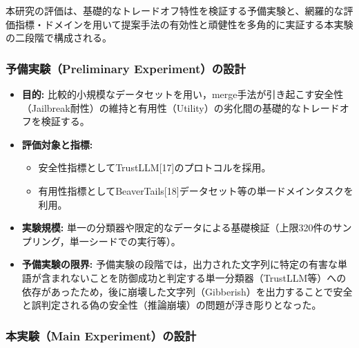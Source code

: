 \documentclass{article}
\begin{document}
本研究の評価は、基礎的なトレードオフ特性を検証する予備実験と、網羅的な評価指標・ドメインを用いて提案手法の有効性と頑健性を多角的に実証する本実験の二段階で構成される。

\subsubsection{予備実験（Preliminary Experiment）の設計}

\begin{itemize}
    \item \textbf{目的:}
    比較的小規模なデータセットを用い，merge手法が引き起こす安全性（Jailbreak耐性）の維持と有用性（Utility）の劣化間の基礎的なトレードオフを検証する。
    \item \textbf{評価対象と指標:}
    \begin{itemize}
        \item 安全性指標としてTrustLLM[17]のプロトコルを採用。
        \item 有用性指標としてBeaverTails[18]データセット等の単一ドメインタスクを利用。
    \end{itemize}
    \item \textbf{実験規模:}
    単一の分類器や限定的なデータによる基礎検証（上限320件のサンプリング，単一シードでの実行等）。
    \item \textbf{予備実験の限界:}
    予備実験の段階では，出力された文字列に特定の有害な単語が含まれないことを防御成功と判定する単一分類器（TrustLLM等）への依存があったため，後に崩壊した文字列（Gibberish）を出力することで安全と誤判定される偽の安全性（推論崩壊）の問題が浮き彫りとなった。
\end{itemize}

\subsubsection{本実験（Main Experiment）の設計}
\end{document}
